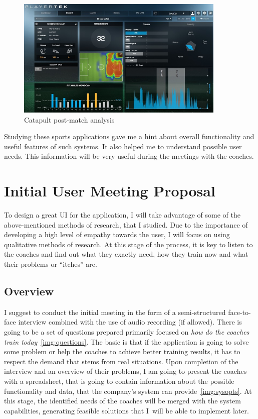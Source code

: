 \begin{figure}[htb]
\begin{center}
  \includegraphics*[width=10cm,keepaspectratio]{images/catapult}
\end{center}
\caption{Catapult post-match analysis}
\label{img:catapult}
\end{figure}

\bigskip
Studying these sports applications gave me a hint about overall functionality and useful features of such systems. It also helped me to understand possible user needs. This information will be very useful during the meetings with the coaches.

\section{Initial User Meeting Proposal}
To design a great UI for the application, I will take advantage of some of the above-mentioned methods of research, that I studied. Due to the importance of developing a high level of empathy towards the user, I will focus on using qualitative methods of research. At this stage of the process, it is key to listen to the coaches and find out what they exactly need, how they train now and what their problems or “itches” are.

\subsection{Overview}
I suggest to conduct the initial meeting in the form of a semi-structured face-to-face interview combined with the use of audio recording (if allowed). There is going to be a set of questions prepared primarily focused on \textit{how do the coaches train today}~\ref{img:questions}. The basic is that if the application is going to solve some problem or help the coaches to achieve better training results, it has to respect the demand that stems from real situations. Upon completion of the interview and an overview of their problems, I am going to present the coaches with a spreadsheet, that is going to contain information about the possible functionality and data, that the company’s system can provide~\ref{img:sysopts}. At this stage, the identified needs of the coaches will be merged with the system capabilities, generating feasible solutions that I~will be able to implement later.

